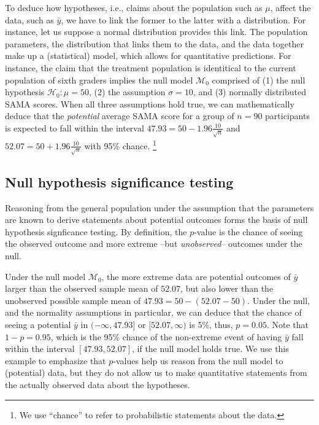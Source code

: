 \documentclass[english,,doc,floatsintext]{apa6}
\begin{document}
To deduce how hypotheses, i.e., claims about the population such as \(\mu\), affect the data, such as \(\bar{y}\), we have to link the former to the latter with a distribution. For instance, let us suppose a normal distribution provides this link. The population parameters, the distribution that links them to the data, and the data together make up a (statistical) model, which allows for quantitative predictions. For instance, the claim that the treatment population is identitical to the current population of sixth graders implies the null model \(\mathcal{M}_{0}\) comprised of (1) the null hypothesis \(\mathcal{H}_{0}: \mu = 50\), (2) the assumption \(\sigma = 10\), and (3) normally distributed SAMA scores. When all three assumptions hold true, we can mathematically deduce that the \emph{potential} average SAMA score for a group of \(n = 90\) participants is expected to fall within the interval \(47.93 = 50 - 1.96 \frac{10}{\sqrt{n}}\) and \(52.07 = 50 + 1.96 \frac{10}{\sqrt{n}}\) with 95\% chance.
\footnote{We use ``chance'' to refer to probabilistic statements about the data.}

\subsection{Null hypothesis significance testing}

Reasoning from the general population under the assumption that the parameters are known to derive statements about potential outcomes forms the basis of null hypothesis signficance testing. By definition, the \(p\)-value is the chance of seeing the observed outcome and more extreme --but \emph{unobserved}-- outcomes under the null.

Under the null model \(\mathcal{M}_{0}\), the more extreme data are potential outcomes of \(\bar{y}\) larger than the observed sample mean of \(52.07\), but also lower than the unobserved possible sample mean of \(47.93 = 50 - (52.07-50)\). Under the null, and the normality assumptions in particular, we can deduce that the chance of seeing a potential \(\bar{y}\) in \((- \infty, 47.93]\) or \([52.07, \infty)\) is 5\%, thus, \(p=0.05\). Note that \(1 - p = 0.95\), which is the 95\% chance of the non-extreme event of having \(\bar{y}\) fall within the interval \([47.93, 52.07]\), if the null model holds true. We use this example to emphasize that \(p\)-values help us reason from the null model to (potential) data, but they do not allow us to make quantitative statements from the actually observed data about the hypotheses.
\end{document}
